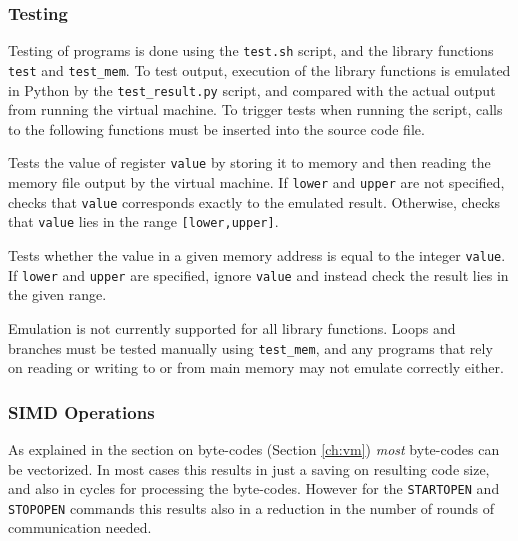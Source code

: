 \subsubsection{Testing}

Testing of programs is done using the \verb|test.sh| script, and the library
functions \verb|test| and \verb|test_mem|. To test output, execution of the
library functions is emulated in Python by the \verb|test_result.py| script,
and compared with the actual output from running the virtual machine.
To trigger tests when running the script, calls to the following functions
must be inserted into the source code file.

Tests the value of register \verb|value| by storing it to memory and then
reading the memory file output by the virtual machine. If \verb|lower| and
\verb|upper| are
not specified, checks that \verb|value| corresponds exactly to the emulated
result. Otherwise, checks that \verb|value| lies in the range
\verb|[lower,upper]|.

Tests whether the value in a given memory address is equal to the integer
\verb|value|. If \verb|lower| and \verb|upper| are specified, ignore \verb|value|
and instead check the result lies in the given range.

Emulation is not currently supported for all library functions. Loops and
branches must be tested manually using \verb|test_mem|, and any programs that
rely on reading or writing to or from main memory may not emulate correctly
either.

\subsubsection{SIMD Operations}
As explained in the section on byte-codes (Section \ref{ch:vm}) {\em most} byte-codes
can be vectorized.
In most cases this results in just a saving on resulting code size, and also
in cycles for processing the byte-codes. 
However for the \verb|STARTOPEN| and \verb|STOPOPEN| commands this
results also in a reduction in the number of rounds of communication needed.

